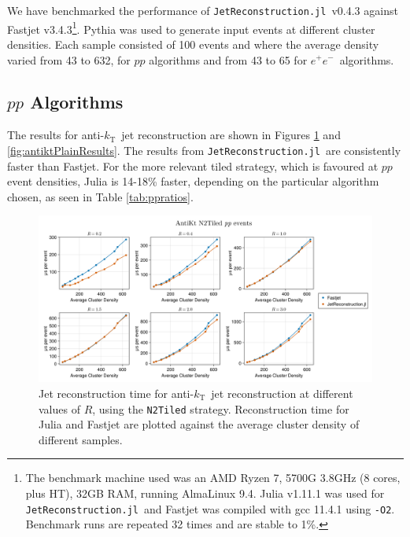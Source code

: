 \documentclass{webofc}
\newcommand{\akt}{anti-${k}_\text{T}$}
\newcommand{\JR}{\texttt{JetReconstruction.jl}}
\newcommand{\ee}{$e^+e^-$}
\begin{document}
We have benchmarked the performance of \JR\ v0.4.3 against Fastjet
v3.4.3\footnote{The benchmark machine used was an AMD Ryzen 7, 5700G 3.8GHz (8
cores, plus HT), 32GB RAM, running AlmaLinux 9.4. Julia v1.11.1 was used for
\JR\ and Fastjet was compiled with gcc 11.4.1 using \texttt{-O2}. Benchmark runs
are repeated 32 times and are stable to 1\%.}. Pythia was used to generate input
events at different cluster densities. Each sample consisted of 100 events and
where the average density varied from 43 to 632, for $pp$ algorithms and from 43 to
65 for \ee\ algorithms.

\subsection{$pp$ Algorithms}

The results for \akt\ jet reconstruction are shown in Figures
\ref{fig:antiktTiledResults} and \ref{fig:antiktPlainResults}. The results from
\JR\ are consistently faster than Fastjet. For the more relevant tiled strategy,
which is favoured at $pp$ event densities, Julia is 14-18\% faster, depending on
the particular algorithm chosen, as seen in Table \ref{tab:ppratios}.

\begin{figure}[ht]
    \begin{center}
        \includegraphics[width=0.8\linewidth]{Alma9-AMD-Ryzen7-Julia-Fastjet-AntiKt-N2Tiled-MultiR.png}
        \caption{Jet reconstruction time for \akt\ jet reconstruction at different values of $R$, using the \texttt{N2Tiled} strategy. Reconstruction time for Julia and Fastjet are plotted against the average cluster density of different samples.}
        \label{fig:antiktTiledResults}
    \end{center}
\end{figure}
\end{document}
